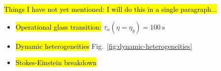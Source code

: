 \documentclass[11pt,twoside]{report}
\begin{document}
\hl{Things I have not yet mentioned: I will do this in a single paragraph...}
\begin{itemize}
\item \hl{Operational glass transition:} $\tau_\alpha(\eta = \eta_g) = \SI{100}{\second}$
\item \hl{Dynamic heterogeneities} Fig.\ \ref{fig:dynamic-heterogeneities}
\item \hl{Stokes-Einstein breakdown}
\end{itemize}





\end{document}
